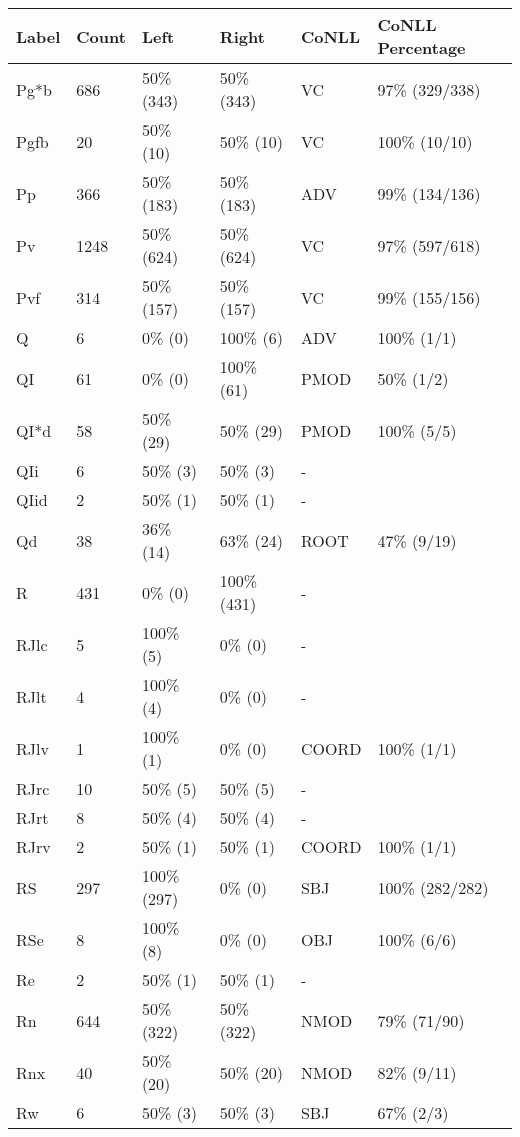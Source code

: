 \begin{figure*}
\begin{tabular}{|l|l|l|l||l|l|}
\hline
Label & Count & Left & Right & CoNLL & CoNLL Percentage\\ 
\hline
 Pg*b & 686 & 50\% (343) & 50\% (343) & VC & 97\% (329/338) \\ 
\hline
 Pgfb & 20 & 50\% (10) & 50\% (10) & VC & 100\% (10/10) \\ 
\hline
 Pp & 366 & 50\% (183) & 50\% (183) & ADV & 99\% (134/136) \\ 
\hline
 Pv & 1248 & 50\% (624) & 50\% (624) & VC & 97\% (597/618) \\ 
\hline
 Pvf & 314 & 50\% (157) & 50\% (157) & VC & 99\% (155/156) \\ 
\hline
 Q & 6 & 0\% (0) & 100\% (6) & ADV & 100\% (1/1) \\ 
\hline
 QI & 61 & 0\% (0) & 100\% (61) & PMOD & 50\% (1/2) \\ 
\hline
 QI*d & 58 & 50\% (29) & 50\% (29) & PMOD & 100\% (5/5) \\ 
\hline
 QIi & 6 & 50\% (3) & 50\% (3) & - &  \\ 
\hline
 QIid & 2 & 50\% (1) & 50\% (1) & - &  \\ 
\hline
 Qd & 38 & 36\% (14) & 63\% (24) & ROOT & 47\% (9/19) \\ 
\hline
 R & 431 & 0\% (0) & 100\% (431) & - &  \\ 
\hline
 RJlc & 5 & 100\% (5) & 0\% (0) & - &  \\ 
\hline
 RJlt & 4 & 100\% (4) & 0\% (0) & - &  \\ 
\hline
 RJlv & 1 & 100\% (1) & 0\% (0) & COORD & 100\% (1/1) \\ 
\hline
 RJrc & 10 & 50\% (5) & 50\% (5) & - &  \\ 
\hline
 RJrt & 8 & 50\% (4) & 50\% (4) & - &  \\ 
\hline
 RJrv & 2 & 50\% (1) & 50\% (1) & COORD & 100\% (1/1) \\ 
\hline
 RS & 297 & 100\% (297) & 0\% (0) & SBJ & 100\% (282/282) \\ 
\hline
 RSe & 8 & 100\% (8) & 0\% (0) & OBJ & 100\% (6/6) \\ 
\hline
 Re & 2 & 50\% (1) & 50\% (1) & - &  \\ 
\hline
 Rn & 644 & 50\% (322) & 50\% (322) & NMOD & 79\% (71/90) \\ 
\hline
 Rnx & 40 & 50\% (20) & 50\% (20) & NMOD & 82\% (9/11) \\ 
\hline
 Rw & 6 & 50\% (3) & 50\% (3) & SBJ & 67\% (2/3) \\ 

\end{tabular}
\end{figure*}
